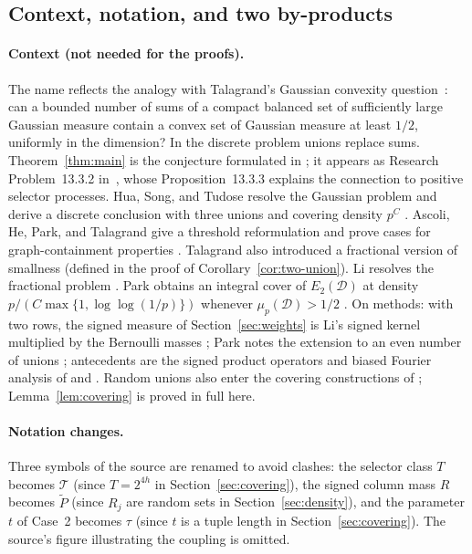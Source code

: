 \documentclass[11pt,letterpaper]{article}
\theoremstyle{definition}
\theoremstyle{remark}
\numberwithin{equation}{section}
\begin{document}
\subsection{Context, notation, and two by-products}
\label{sec:context}

\paragraph{Context (not needed for the proofs).}
The name reflects the analogy with Talagrand's Gaussian convexity question~\cite[Conjecture~2.1]{Talagrand10}: can a bounded number of sums of a compact balanced set of sufficiently large Gaussian measure contain a convex set of Gaussian measure at least $1/2$, uniformly in the dimension? In the discrete problem unions replace sums. Theorem~\ref{thm:main} is the conjecture formulated in \cite[Conjecture~7.1]{Talagrand10}; it appears as Research Problem~13.3.2 in~\cite{Talagrand21}, whose Proposition~13.3.3 explains the connection to positive selector processes. Hua, Song, and Tudose resolve the Gaussian problem and derive a discrete conclusion with three unions and covering density $p^C$ \cite[Corollaries~1.3--1.4]{HuaSongTudose26}. Ascoli, He, Park, and Talagrand give a threshold reformulation and prove cases for graph-containment properties \cite[Proposition~1.5 and Theorems~1.10--1.13]{AscoliEtAl26}. Talagrand also introduced a fractional version of smallness \cite[Sections~6 and~7]{Talagrand10} (defined in the proof of Corollary~\ref{cor:two-union}). Li resolves the fractional problem \cite[Theorem~1.9]{Li26}. Park obtains an integral cover of $E_2(\mathcal D)$ at density $p/(C\max\{1,\log\log(1/p)\})$ whenever $\mu_p(\mathcal D)>1/2$ \cite[Corollary~3.5]{Park26}. On methods: with two rows, the signed measure of Section~\ref{sec:weights} is Li's signed kernel multiplied by the Bernoulli masses \cite[Section~2]{Li26}; Park notes the extension to an even number of unions \cite[Corollary~3.5, footnote~3]{Park26}; antecedents are the signed product operators and biased Fourier analysis of \cite[Section~2.2]{Friedgut08} and \cite[Sections~2.2 and~4.1]{EllisFilmusFriedgut12}. Random unions also enter the covering constructions of \cite[Sections~1.1 and~2]{FischerPerson25}; Lemma~\ref{lem:covering} is proved in full here.

\paragraph{Notation changes.}
Three symbols of the source are renamed to avoid clashes: the selector class $T$ becomes $\mathcal T$ (since $T=2^{4h}$ in Section~\ref{sec:covering}), the signed column mass $R$ becomes $\widetilde P$ (since $R_j$ are random sets in Section~\ref{sec:density}), and the parameter $t$ of Case~2 becomes $\tau$ (since $t$ is a tuple length in Section~\ref{sec:covering}). The source's figure illustrating the coupling is omitted.
\end{document}
